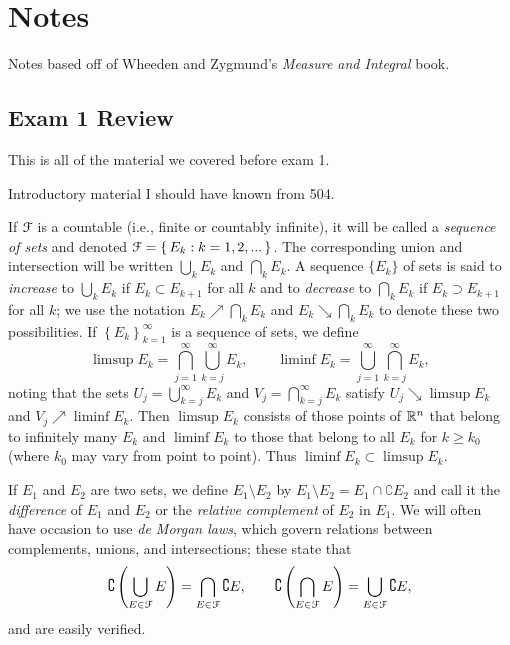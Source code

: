 \chapter{Notes}
Notes based off of Wheeden and Zygmund's \emph{Measure and Integral} book.
\section{Exam 1 Review}
This is all of the material we covered before exam 1.

\bigskip

Introductory material I should have known from 504.

If $\mathcal{F}$ is a countable (i.e., finite or countably infinite), it will be
called a \emph{sequence of sets} and denoted
$\mathcal{F}=\left\{\,E_k:k=1,2,...\,\right\}$. The corresponding union
and intersection will be written $\bigcup_k E_k$ and $\bigcap_k E_k$. A
sequence $\{E_k\}$ of sets is said to \emph{increase} to $\bigcup_k E_k$ if
$E_k\subset E_{k+1}$ for all $k$ and to \emph{decrease} to $\bigcap_k E_k$
if $E_k\supset E_{k+1}$ for all $k$; we use the notation
$E_k\nearrow\bigcap_k E_k$ and $E_k\searrow\bigcap_k E_k$ to denote these
two possibilities. If $\left\{E_k\right\}_{k=1}^\infty$ is a sequence of
sets, we define
\begin{equation}
\label{eq:limsup-liminf-sets}
\limsup E_k=\bigcap_{j=1}^\infty\bigcup_{k=j}^\infty E_k,\qquad
\liminf E_k=\bigcup_{j=1}^\infty\bigcap_{k=j}^\infty E_k,
\end{equation}
noting that the sets $U_j=\bigcup_{k=j}^\infty E_k$ and
$V_j=\bigcap_{k=j}^\infty E_k$ satisfy $U_j\searrow\limsup E_k$ and
$V_j\nearrow\liminf E_k$. Then $\limsup E_k$ consists of those points of
$\mathbb{R}^n$ that belong to infinitely many $E_k$ and $\liminf E_k$ to those
that belong to all $E_k$ for $k\geq k_0$ (where $k_0$ may vary from point
to point). Thus $\liminf E_k\subset\limsup E_k$.

If $E_1$ and $E_2$ are two sets, we define $E_1\setminus E_2$ by
$E_1\setminus E_2= E_1\cap\complement E_2$ and call it the
\emph{difference} of $E_1$ and $E_2$ or the \emph{relative complement} of
$E_2$ in $E_1$. We will often have occasion to use \emph{de Morgan laws},
which govern relations between complements, unions, and intersections;
these state that
\begin{equation}
\label{eq:de-morgan-laws}
\complement
\left(\bigcup_{E\in\mathcal{F}}E\right)=
\bigcap_{E\in\mathcal{F}}\complement E,\qquad
\complement
\left(\bigcap_{E\in\mathcal{F}}E\right)=
\bigcup_{E\in\mathcal{F}}\complement E,
\end{equation}
and are easily verified.

